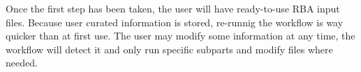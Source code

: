\documentclass[12pt]{scrartcl}
\theoremstyle{definition}
\theoremstyle{remark}
\numberwithin{equation}{section}
\begin{document}
Once the first step has been taken, the user will have ready-to-use RBA input files. Because user curated information is stored, re-runnig the workflow is way quicker than at first use. The user may modify some information at any time, the workflow will detect it and only run specific subparts and modify files where needed.

\clearpage



\appendix


%
%
\end{document}
